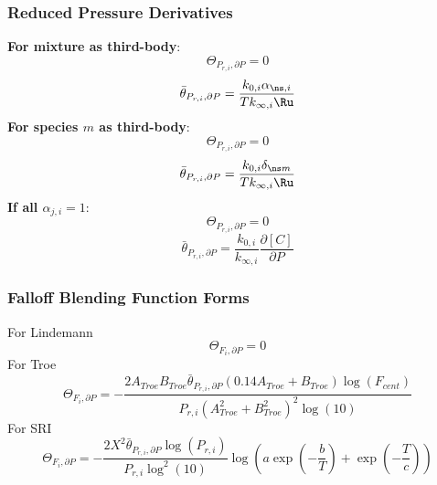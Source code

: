 \documentclass[a4paper,10pt]{article}
\begin{document}
\subsubsection{Reduced Pressure Derivatives}
\textbf{For mixture as third-body}:
\begin{dmath} \Theta_{P_{r,i}, \partial P} = 0\end{dmath} 
\begin{dmath} \bar{\theta}_{P_{r, i}, \partial P} = \frac{k_{0, i} \alpha_{\ns,i}}{T k_{\infty, i} \Ru}\end{dmath} 
\textbf{For species $m$ as third-body}:
\begin{dmath} \Theta_{P_{r,i}, \partial P} = 0\end{dmath} 
\begin{dmath} \bar{\theta}_{P_{r, i}, \partial P} = \frac{k_{0, i} \delta_{\ns m}}{T k_{\infty, i} \Ru}\end{dmath} 
\textbf{If all $\alpha_{j,i} = 1$}:
\begin{dmath} \Theta_{P_{r,i}, \partial P} = 0\end{dmath} 
\begin{dmath} \bar{\theta}_{P_{r, i}, \partial P} = \frac{k_{0, i}}{k_{\infty, i}} \frac{\partial [C] }{\partial P }\end{dmath} 
\subsubsection{Falloff Blending Function Forms}
For Lindemann
\begin{dmath} \Theta_{F_i, \partial P} = 0\end{dmath} 
For Troe
\begin{dmath} \Theta_{F_i, \partial P} = - \frac{2 A_{Troe} B_{Troe} \bar{\theta}_{P_{r, i}, \partial P} \left(0.14 A_{Troe} + B_{Troe}\right) \log{\left (F_{cent} \right )}}{P_{r, i} \left(A_{Troe}^{2} + B_{Troe}^{2}\right)^{2} \log{\left (10 \right )}}\end{dmath} 
For SRI
\begin{dmath} \Theta_{F_i, \partial P} = - \frac{2 X^{2} \bar{\theta}_{P_{r, i}, \partial P} \log{\left (P_{r, i} \right )}}{P_{r, i} \log^{2}{\left (10 \right )}} \log{\left (a \operatorname{exp}\left({- \frac{b}{T}}\right) + \operatorname{exp}\left({- \frac{T}{c}}\right) \right )}\end{dmath} 
\end{document}
